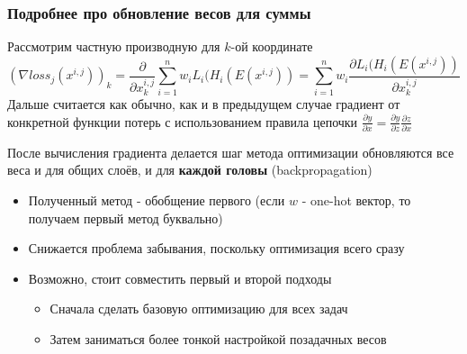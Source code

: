 \documentclass[aspectratio=169]{beamer}
\begin{document}
\begin{frame}
	\frametitle{Подробнее про обновление весов для суммы}
	Рассмотрим частную производную для $k$-ой координате
	\begin{equation*}
		(\nabla loss_j (x^{i, j}))_k = \frac{\partial}{\partial x^{i, j}_k} \sum_{i = 1}^{n} w_i L_i(H_i(E(x^{i, j})) = \sum_{i = 1}^{n} w_i \frac{\partial L_i(H_i(E(x^{i, j}))}{\partial x^{i, j}_k}
	\end{equation*}
	Дальше считается как обычно, как и в предыдущем случае градиент от конкретной функции потерь с использованием правила цепочки $\frac{\partial y}{\partial x} = \frac{\partial y}{\partial z} \frac{\partial z}{\partial x}$

	После вычисления градиента делается шаг метода оптимизации обновляются все веса и для общих слоёв, и для \textbf{каждой головы} (backpropagation)

	\begin{itemize}
		\item Полученный метод - обобщение первого (если $w$ - one-hot вектор, то получаем первый метод буквально)
		\item Снижается проблема забывания, поскольку оптимизация всего сразу
		\item Возможно, стоит совместить первый и второй подходы
		\begin{itemize}
			\item Сначала сделать базовую оптимизацию для всех задач
			\item Затем заниматься более тонкой настройкой позадачных весов
		\end{itemize}
	\end{itemize}
\end{frame}
\end{document}
